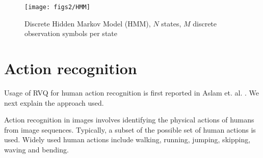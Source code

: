 \begin{Body}
%
%
%
%
%



								\begin{figure}[t]		
								\texttt{[image: figs2/HMM]}
								\caption{Discrete Hidden Markov Model (HMM), $N$ states, $M$ discrete observation symbols per state}
								\label{fig:HMM}
								\end{figure}


\section{Action recognition}
Usage of RVQ for human action recognition is first reported in Aslam et. al. \cite{2010_CNF_HMMRVQ_Aslam}.  We next explain the approach used.

Action recognition in images involves identifying the physical actions of humans from image sequences.  Typically, a subset of the possible set of human actions is used.  Widely used human actions include walking, running, jumping, skipping, waving and bending. 


\end{Body}
